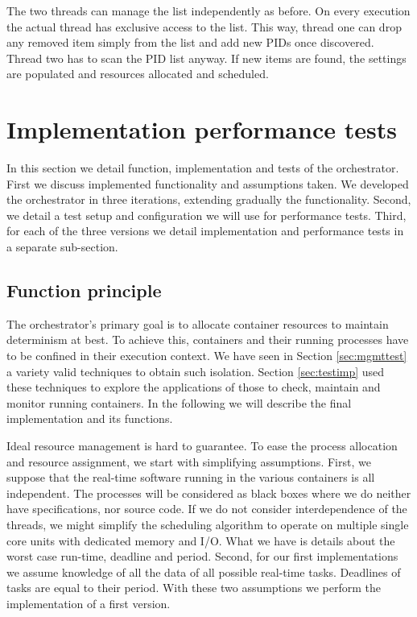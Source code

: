 \documentclass[]{scrartcl}
\begin{document}
The two threads can manage the list independently as before. On every execution the actual thread has exclusive access to the list.
This way, thread one can drop any removed item simply from the list and add new PIDs once discovered. 
Thread two has to scan the PID list anyway.
If new items are found, the settings are populated and resources allocated and scheduled.

\section{Implementation performance tests}
\label{sec:perftest}

In this section we detail function, implementation and tests of the orchestrator.
First we discuss implemented functionality and assumptions taken. 
We developed the orchestrator in three iterations, extending gradually the functionality.
Second, we detail a test setup and configuration we will use for performance tests.
Third, for each of the three versions we detail implementation and performance tests in a separate sub-section. 

\subsection{Function principle}

The orchestrator's primary goal is to allocate container resources to maintain determinism at best.
To achieve this, containers and their running processes have to be confined in their execution context. 
We have seen in Section \ref{sec:mgmttest} a variety valid techniques to obtain such isolation.
Section \ref{sec:testimp} used these techniques to explore the applications of those to check, maintain and monitor running containers.
In the following we will describe the final implementation and its functions.

Ideal resource management is hard to guarantee.
To ease the process allocation and resource assignment, we start with simplifying assumptions.
First, we suppose that the real-time software running in the various containers is all independent. 
The processes will be considered as black boxes where we do neither have specifications, nor source code. 
If we do not consider interdependence of the threads, we might simplify the scheduling algorithm to operate on multiple single core units with dedicated memory and I/O.
What we have is details about the worst case run-time, deadline and period.
Second, for our first implementations we assume knowledge of all the data of all possible real-time tasks. Deadlines of tasks are equal to their period.
With these two assumptions we perform the implementation of a first version. 
\end{document}

